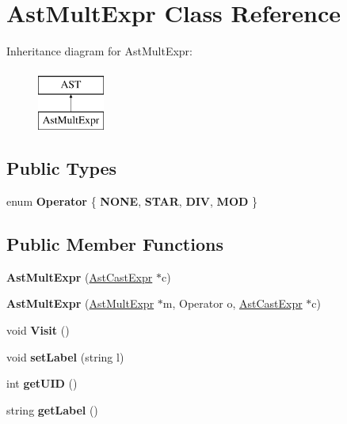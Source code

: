 \hypertarget{classAstMultExpr}{\section{Ast\-Mult\-Expr Class Reference}
\label{classAstMultExpr}
}
Inheritance diagram for Ast\-Mult\-Expr\-:\begin{figure}[H]
\begin{center}
\leavevmode
\includegraphics[height=2.000000cm]{classAstMultExpr}
\end{center}
\end{figure}
\subsection*{Public Types}
\begin{DoxyCompactItemize}
\item 
enum {\bfseries Operator} \{ {\bfseries N\-O\-N\-E}, 
{\bfseries S\-T\-A\-R}, 
{\bfseries D\-I\-V}, 
{\bfseries M\-O\-D}
 \}
\end{DoxyCompactItemize}
\subsection*{Public Member Functions}
\begin{DoxyCompactItemize}
\item 
\hypertarget{classAstMultExpr_a5ff1c515cad4ae7084d44d7663a937bc}{{\bfseries Ast\-Mult\-Expr} (\hyperlink{classAstCastExpr}{Ast\-Cast\-Expr} $\ast$c)}\label{classAstMultExpr_a5ff1c515cad4ae7084d44d7663a937bc}

\item 
\hypertarget{classAstMultExpr_a1ef684e47bbad3aa857098807a16ee00}{{\bfseries Ast\-Mult\-Expr} (\hyperlink{classAstMultExpr}{Ast\-Mult\-Expr} $\ast$m, Operator o, \hyperlink{classAstCastExpr}{Ast\-Cast\-Expr} $\ast$c)}\label{classAstMultExpr_a1ef684e47bbad3aa857098807a16ee00}

\item 
\hypertarget{classAstMultExpr_aea6419ae54b97e882c9a9ab79ca73529}{void {\bfseries Visit} ()}\label{classAstMultExpr_aea6419ae54b97e882c9a9ab79ca73529}

\item 
\hypertarget{classAST_a71d680856e95ff89f55d5311a552eba6}{void {\bfseries set\-Label} (string l)}\label{classAST_a71d680856e95ff89f55d5311a552eba6}

\item 
\hypertarget{classAST_ab7a5b1d9f1c2de0d98deb356f724a42c}{int {\bfseries get\-U\-I\-D} ()}\label{classAST_ab7a5b1d9f1c2de0d98deb356f724a42c}

\item 
\hypertarget{classAST_aee029be902fffc927d16ccb03eb922ad}{string {\bfseries get\-Label} ()}\label{classAST_aee029be902fffc927d16ccb03eb922ad}

\end{DoxyCompactItemize}
